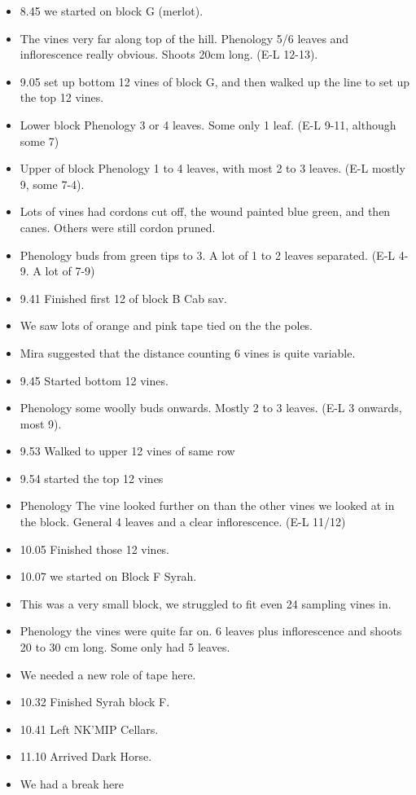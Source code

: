 \documentclass[11pt,letter]{article}
\newenvironment{smitemize}{
\begin{itemize}
  \setlength{\itemsep}{0pt}
  \setlength{\parskip}{0.8pt}
  \setlength{\parsep}{0pt}}
{\end{itemize}
}
\begin{document}
\begin{smitemize}
\item 8.45 we started on block G (merlot). 
\item The vines very far along top of the hill. Phenology 5/6 leaves and inflorescence really obvious. Shoots 20cm long. (E-L 12-13).
\item 9.05 set up bottom 12 vines of block G, and then walked up the line to set up the top 12 vines.
\item Lower block Phenology 3 or 4 leaves. Some only 1 leaf. (E-L 9-11, although some 7) 
\item Upper of block Phenology 1 to 4 leaves, with most 2 to 3 leaves. (E-L mostly 9, some 7-4).
\item Lots of vines had cordons cut off, the wound painted blue green, and then canes. Others were still cordon pruned. 
\item Phenology buds from green tips to 3. A lot of 1 to 2 leaves separated. (E-L 4-9. A lot of 7-9)
\item 9.41 Finished first 12 of block B Cab sav.
\item We saw lots of orange and pink tape tied on the the poles.
\item Mira suggested that the distance counting 6 vines is quite variable.
\item 9.45 Started bottom 12 vines. 
\item Phenology some woolly buds onwards. Mostly 2 to 3 leaves. (E-L 3 onwards, most 9).
\item 9.53 Walked to upper 12 vines of same row 
\item 9.54 started the top 12 vines 
\item Phenology The vine looked further on than the other vines we looked at in the block. General 4 leaves and a clear inflorescence. (E-L 11/12) 
\item 10.05 Finished those 12 vines.
\item 10.07 we started on Block F Syrah.
\item This was a very small block, we struggled to fit even 24 sampling vines in. 
\item Phenology the vines were quite far on. 6 leaves plus inflorescence and shoots 20 to 30 cm long. Some only had 5 leaves. 
\item We needed a new role of tape here. 
\item 10.32 Finished Syrah block F.
\item 10.41 Left NK'MIP Cellars.
\item 11.10 Arrived Dark Horse. 
\item We had a break here 

\end{smitemize}
\end{document}
